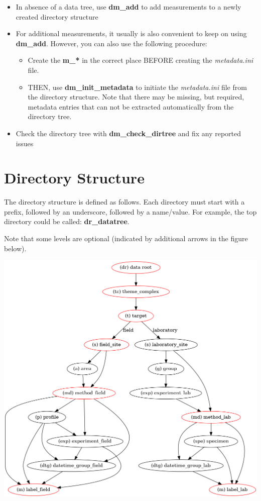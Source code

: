 \documentclass[fontsize=12]{scrartcl}
\begin{document}
\begin{itemize}
	\item In absence of a data tree, use \textbf{dm\_add} to add measurements
		to a newly created directory structure
	\item For additional measurements, it usually is also convenient to keep on
		using \textbf{dm\_add}. However, you can also use the following procedure:
		\begin{itemize}
			\item Create the \textbf{m\_*} in the correct place BEFORE creating the
				\textsl{metadata.ini} file.
			\item THEN, use \textbf{dm\_init\_metadata} to initiate the
				\textsl{metadata.ini} file from the directory structure. Note
				that there may be missing, but required, metadata entries that
				can not be extracted automatically from the directory tree.
		\end{itemize}
	\item Check the directory tree with \textbf{dm\_check\_dirtree} and fix any
		reported issues
\end{itemize}

\section{Directory Structure}

The directory structure is defined as follows. Each directory must start with a
prefix, followed by an underscore, followed by a name/value. For example, the
top directory could be called: \textbf{dr\_datatree}.

Note that some levels are optional (indicated by additional arrows in the
figure below).

\includegraphics[width=\textwidth]{dirtree.png}
\end{document}

